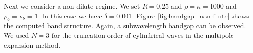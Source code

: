 \documentclass[11pt]{article}
\numberwithin{equation}{section}
\newcommand\1{{\ensuremath {\mathds 1} }}
\begin{document}
{{Next we consider a non-dilute regime. We set $R=0.25$ and $\rho=\kappa=1000$ and $\rho_b=\kappa_b=1$. In this case we have $\delta=0.001$.
Figure \ref{fig:bandgap_nondilute} shows  the computed band structure. 
Again, a subwavelength bandgap can be  observed.
We used $N=3$ for the truncation order of cylindrical waves in the  multipole expansion method.



}}
\end{document}

